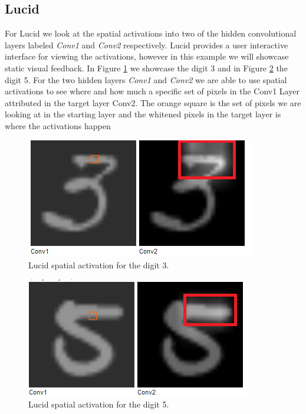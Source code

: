 \subsection{Lucid}
For Lucid we look at the spatial activations into two of the hidden convolutional layers labeled \emph{Conv1} and \emph{Conv2} respectively. Lucid provides a user interactive interface for viewing the activations, however in this example we will showcase static visual feedback. In Figure \ref{fig:lucid-mnist-3} we showcase the digit 3 and in Figure \ref{fig:lucid-mnist-5} the digit 5. For the two hidden layers \emph{Conv1} and \emph{Conv2} we are able to use spatial activations to see where and how much a specific set of pixels in the Conv1 Layer attributed in the target layer Conv2. The orange square is the set of pixels we are looking at in the starting layer and the whitened pixels in the target layer is where the activations happen

\begin  {figure}[!htpb]
  \includegraphics[width=\linewidth]{Evaluation_Images/LUCID_MNISTS_3.png}
  \caption{Lucid spatial activation for the digit 3.}
  \label{fig:lucid-mnist-3}
\end{figure} 
\begin  {figure}[!htpb]
  \includegraphics[width=\linewidth]{Evaluation_Images/LUCID_MNISTS_5.png}
  \caption{Lucid spatial activation for the digit 5.}
  \label{fig:lucid-mnist-5}
\end{figure} 

